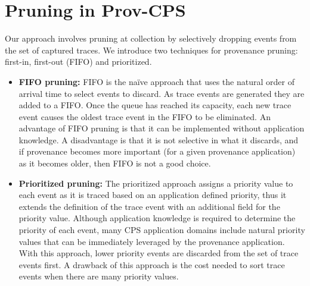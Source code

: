 \section{Pruning in Prov-CPS} \label{Pruning}
Our approach involves pruning at collection by selectively dropping events from the set of captured traces. We introduce two techniques for provenance pruning: first-in, first-out (FIFO) and prioritized.  
\begin{itemize}


\item\textbf{FIFO pruning:}  
  FIFO is the na\"ive approach that uses the natural order of arrival time to select events to discard. As trace events are generated they are added to a FIFO. Once the queue has reached its capacity, each new trace event causes the oldest trace event in the FIFO to be eliminated. An advantage of FIFO pruning is that it can be implemented without application knowledge. A disadvantage is that it is not selective in what it discards, and if provenance becomes more important (for a given provenance application) as it becomes older, then FIFO is not a good choice.

\item \textbf{Prioritized pruning:}
The prioritized approach assigns a priority value to each event as it is traced based on an application defined priority, thus it extends the definition of the trace event with an additional field for the priority value. Although application knowledge is required to determine the priority of each event, many CPS application domains include natural priority values that can be immediately leveraged by the provenance application. With this approach, lower priority events are discarded from the set of trace events first. A drawback of this approach is the cost needed to sort trace events when there are many priority values.

\end{itemize}
